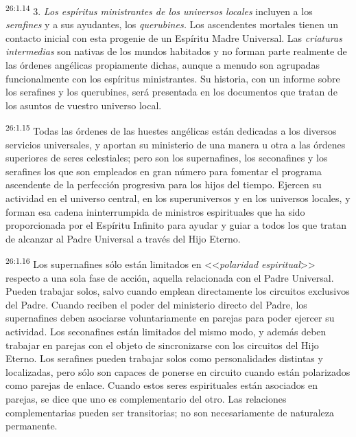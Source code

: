 \par
\textsuperscript{26:1.14} 3. \textit{Los espíritus ministrantes de los universos locales} incluyen a los \textit{serafines} y a sus ayudantes, los \textit{querubines.} Los ascendentes mortales tienen un contacto inicial con esta progenie de un Espíritu Madre Universal. Las \textit{criaturas intermedias} son nativas de los mundos habitados y no forman parte realmente de las órdenes angélicas propiamente dichas, aunque a menudo son agrupadas funcionalmente con los espíritus ministrantes. Su historia, con un informe sobre los serafines y los querubines, será presentada en los documentos que tratan de los asuntos de vuestro universo local.

\par
\textsuperscript{26:1.15} Todas las órdenes de las huestes angélicas están dedicadas a los diversos servicios universales, y aportan su ministerio de una manera u otra a las órdenes superiores de seres celestiales; pero son los supernafines, los seconafines y los serafines los que son empleados en gran número para fomentar el programa ascendente de la perfección progresiva para los hijos del tiempo. Ejercen su actividad en el universo central, en los superuniversos y en los universos locales, y forman esa cadena ininterrumpida de ministros espirituales que ha sido proporcionada por el Espíritu Infinito para ayudar y guiar a todos los que tratan de alcanzar al Padre Universal a través del Hijo Eterno.

\par
\textsuperscript{26:1.16} Los supernafines sólo están limitados en <<\textit{polaridad espiritual}>> respecto a una sola fase de acción, aquella relacionada con el Padre Universal. Pueden trabajar solos, salvo cuando emplean directamente los circuitos exclusivos del Padre. Cuando reciben el poder del ministerio directo del Padre, los supernafines deben asociarse voluntariamente en parejas para poder ejercer su actividad. Los seconafines están limitados del mismo modo, y además deben trabajar en parejas con el objeto de sincronizarse con los circuitos del Hijo Eterno. Los serafines pueden trabajar solos como personalidades distintas y localizadas, pero sólo son capaces de ponerse en circuito cuando están polarizados como parejas de enlace. Cuando estos seres espirituales están asociados en parejas, se dice que uno es complementario del otro. Las relaciones complementarias pueden ser transitorias; no son necesariamente de naturaleza permanente.

